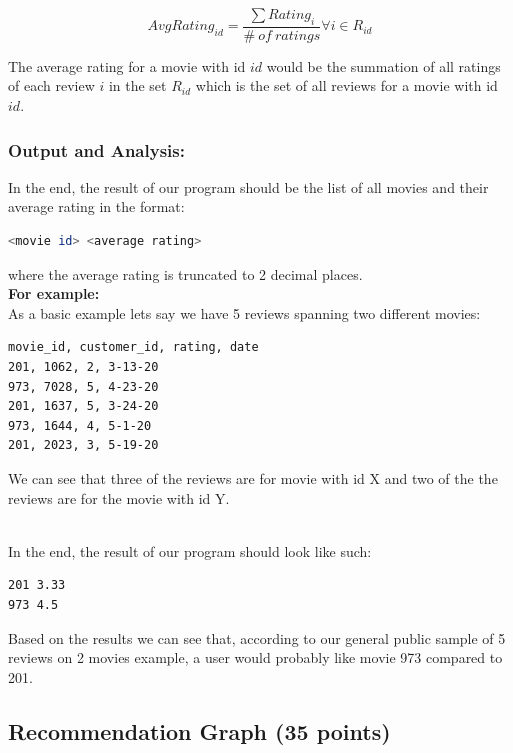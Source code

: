 \documentclass{article}
\begin{document}
\vspace{0.1cm}
$$AvgRating_{id} = \frac{\sum Rating_i}{\#\ of\ ratings} \forall i \in R_{id}$$
\vspace{0.1cm}

\noindent The average rating for a movie with id $id$ would be the summation of all ratings of each review $i$ in the set $R_{id}$ which is the set of all reviews for a movie with id $id$.

\subsubsection*{Output and Analysis:}
In the end, the result of our program should be the list of all movies and their average rating in the format:
\begin{lstlisting}[language=bash]
                        <movie id> <average rating> 
\end{lstlisting}
\vspace{0.1cm}
where the average rating is truncated to 2 decimal places.\\

\noindent \textbf{For example:}\\
As a basic example lets say we have 5 reviews spanning two different movies: 
\begin{Verbatim}[frame=single]
movie_id, customer_id, rating, date
201, 1062, 2, 3-13-20
973, 7028, 5, 4-23-20
201, 1637, 5, 3-24-20
973, 1644, 4, 5-1-20
201, 2023, 3, 5-19-20
\end{Verbatim}
We can see that three of the reviews are for movie with id X and two of the the reviews are for the movie with id Y.

\-\ \\In the end, the result of our program should look like such:
\begin{Verbatim}[frame=single]
201 3.33
973 4.5
\end{Verbatim}
Based on the results we can see that, according to our general public sample of 5 reviews on 2 movies example, a user would probably like movie 973 compared to 201. 

\newpage
\subsection{Recommendation Graph (35 points)}
\end{document}
